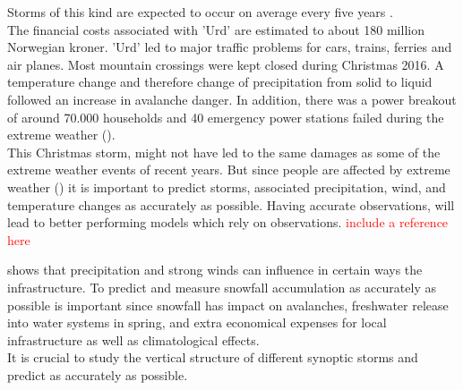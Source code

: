 Storms of this kind are expected to occur on average every five years \citep{olsen_ekstremvaerrapport._2017}. \\ 
The financial costs associated with 'Urd' are estimated to about 180 million Norwegian kroner.
'Urd' led to major traffic problems for cars, trains, ferries and air planes. Most mountain crossings were kept closed during Christmas 2016.  A temperature change and therefore change of precipitation from solid to liquid followed an increase in avalanche danger.
In addition, there was a power breakout of around 70.000 households and 40 emergency power stations failed during the extreme weather (). 
\\
This Christmas storm, might not have led to the same damages as some of the extreme weather events of recent years. But since people are affected by extreme weather () it is important to predict storms, associated precipitation, wind, and temperature changes as accurately as possible. Having accurate observations, will lead to better performing models which rely on observations. \textcolor{red}{include a reference here}

\newline
\noindent
{} shows that precipitation and strong winds can influence in certain ways the infrastructure. To predict and measure snowfall accumulation as accurately as possible is important since snowfall has impact on avalanches, freshwater release into water systems in spring, and extra economical expenses for local infrastructure as well as climatological effects. \\
It is crucial to study the vertical structure of different synoptic storms and  predict as accurately as possible.\\
